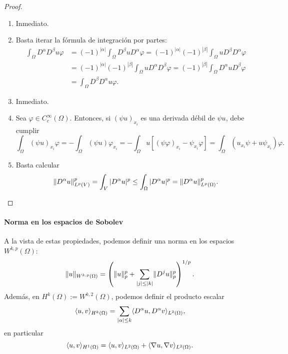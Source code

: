 \documentclass[12pt,a4paper]{book}
\DeclarePairedDelimiter\norm{\lVert}{\rVert}
\DeclarePairedDelimiter\esc{\langle}{\rangle}
\theoremstyle{definition} \newtheorem{defn}[thm]{Definición}
\theoremstyle{definition} \newtheorem{ejemplo}[thm]{Ejemplo}
\theoremstyle{definition} \newtheorem{ejercicio}[thm]{Ejercicio}
\theoremstyle{remark} \newtheorem*{obs}{Observación}
\begin{document}
  \begin{proof}\leavevmode
    \begin{enumerate}
      \item Inmediato.
      \item Basta iterar la fórmula de integración por partes:
	\begin{align*}
	  \int_\Omega D^\alpha D^\beta u \varphi & = (-1)^{|\alpha|} \int_\Omega D^\beta u D^\alpha \varphi = (-1)^{|\alpha|} (-1)^{|\beta|} \int_\Omega u D^\beta D^\alpha \varphi \\ & = (-1)^{|\alpha|} (-1)^{|\beta|} \int_\Omega u  D^\alpha D^\beta \varphi= (-1)^{|\beta|} \int_\Omega D^\alpha u   D^\beta \varphi \\ &= \int_\Omega  D^\beta D^\alpha u  \varphi. 
	\end{align*}
      \item Inmediato.
      \item Sea $\varphi \in C^\infty_c(\Omega)$. Entonces, si $(\psi u)_{x_i}$ es una derivada débil de $\psi u$, debe cumplir
	\begin{equation*}
	  \int_\Omega (\psi u)_{x_i} \varphi =- \int_\Omega (\psi u) \varphi_{x_i}=-\int_\Omega u \left[ (\psi \varphi)_{x_i} - \psi_{x_i}\varphi \right]= \int_\Omega (u_{x_i}\psi+ u \psi_{x_i}) \varphi.
	\end{equation*}
      \item Basta calcular
	\begin{equation*}
	  \norm{D^\alpha u}^p_{L^p(V)} = \int_V |D^\alpha u|^p \leq \int_\Omega |D^{\alpha} u|^p = \norm{D^\alpha u}^p_{L^p(\Omega)}.
	\end{equation*}
    \end{enumerate}
  \end{proof}
  \paragraph{Norma en los espacios de Sobolev}
  A la vista de estas propiedades, podemos definir una norma en los espacios $W^{k,p}(\Omega)$:
  \begin{equation*}
    \norm{u}_{W^{k,p}(\Omega)}=\left( \norm{u}_p^p + \sum_{|j|\leq |k|}\norm{D^j u}^p_p \right)^{1/p}.
  \end{equation*}
  Además, en $H^k(\Omega):=W^{k,2}(\Omega)$, podemos definir el producto escalar
  \begin{equation*}
    \esc{u,v}_{H^k(\Omega)}=\sum_{|\alpha|\leq k} \esc{D^\alpha u, D^\alpha v}_{L^2(\Omega)},   
  \end{equation*}
  en particular
  \begin{equation*}
    \esc{u,v}_{H^1(\Omega)}=\esc{u,v}_{L^2(\Omega)}+\esc{\nabla u, \nabla v}_{L^2(\Omega)}.
  \end{equation*}
\end{document}
